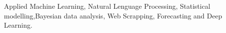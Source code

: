 \newpage
{}


\begin{cvparagraph}
Applied Machine Learning, Natural Lenguage Processing, Statistical modelling,Bayesian data analysis, Web Scrapping, Forecasting and Deep Learning.

\end{cvparagraph}